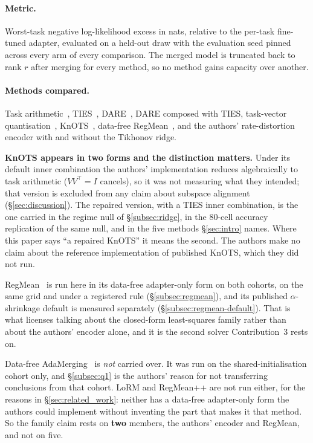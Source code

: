 \paragraph{Metric.} Worst-task negative log-likelihood excess in nats,
relative to the per-task fine-tuned adapter, evaluated on a held-out
draw with the evaluation seed pinned across every arm of every
comparison. The merged model is truncated back to rank $r$ after merging
for every method, so no method gains capacity over another.

\paragraph{Methods compared.} Task arithmetic~\citep{ilharco2023task},
TIES~\citep{yadav2023ties}, DARE~\citep{yu2024dare}, DARE composed with
TIES, task-vector quantisation~\citep{kim2025tvq},
KnOTS~\citep{stoica2025knots}, data-free RegMean~\citep{jin2023regmean}, and
the authors' rate-distortion encoder with and without the Tikhonov ridge.

\textbf{KnOTS appears in two forms and the distinction matters.} Under its
default inner combination the authors' implementation reduces algebraically to task
arithmetic ($VV^\top = I$ cancels), so it was not measuring what they intended;
that version is excluded from any claim about subspace alignment
(\S\ref{sec:discussion}). The repaired version, with a TIES inner
combination, is the one carried in the regime null of \S\ref{subsec:ridge},
in the $80$-cell accuracy replication of the same null, and in the five
methods \S\ref{sec:intro} names. Where this paper says ``a repaired KnOTS''
it means the second. The authors make no claim about the reference implementation of
published KnOTS, which they did not run.

RegMean~\citep{jin2023regmean} is run here in its data-free
adapter-only form on both cohorts, on the same grid and under a registered
rule (\S\ref{subsec:regmean}), and its published $\alpha$-shrinkage default
is measured separately (\S\ref{subsec:regmean-default}). That is what
licenses talking about the closed-form least-squares family rather than about
the authors' encoder alone, and it is the second solver Contribution~3 rests on.

Data-free AdaMerging~\citep{adamerging2024} is \emph{not} carried over. It was
run on the shared-initialisation cohort only, and \S\ref{subsec:q1} is the authors'
reason for not transferring conclusions from that cohort. LoRM and RegMean++
are not run either, for the reasons in \S\ref{sec:related_work}: neither has a
data-free adapter-only form the authors could implement without inventing the part that
makes it that method. So the family claim rests on \textbf{two} members, the authors'
encoder and RegMean, and not on five.

